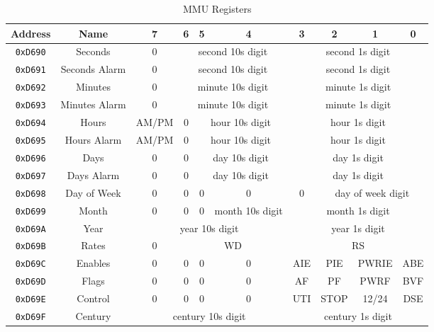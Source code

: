 \begin{table}[h]
	\begin{center}
		\begin{tabular}{| c | c || c | c | c | c | c | c | c | c |} \hline
			Address & Name & 7 & 6 & 5 & 4 & 3 & 2 & 1 & 0 \\ \hline\hline
			\verb+0xD690+ & Seconds & 0 & \multicolumn{3}{|c|}{second 10s digit} & \multicolumn{4}{|c|}{second 1s digit} \\ \hline
            \verb+0xD691+ & Seconds Alarm & 0 & \multicolumn{3}{|c|}{second 10s digit} & \multicolumn{4}{|c|}{second 1s digit} \\ \hline
            \verb+0xD692+ & Minutes & 0 & \multicolumn{3}{|c|}{minute 10s digit} & \multicolumn{4}{|c|}{minute 1s digit} \\ \hline
            \verb+0xD693+ & Minutes Alarm & 0 & \multicolumn{3}{|c|}{minute 10s digit} & \multicolumn{4}{|c|}{minute 1s digit} \\ \hline
            \verb+0xD694+ & Hours & AM/PM & 0 & \multicolumn{2}{|c|}{hour 10s digit} & \multicolumn{4}{|c|}{hour 1s digit} \\ \hline
            \verb+0xD695+ & Hours Alarm & AM/PM & 0 & \multicolumn{2}{|c|}{hour 10s digit} & \multicolumn{4}{|c|}{hour 1s digit} \\ \hline
            \verb+0xD696+ & Days & 0 & 0 & \multicolumn{2}{|c|}{day 10s digit} & \multicolumn{4}{|c|}{day 1s digit} \\ \hline
            \verb+0xD697+ & Days Alarm & 0 & 0 & \multicolumn{2}{|c|}{day 10s digit} & \multicolumn{4}{|c|}{day 1s digit} \\ \hline
            \verb+0xD698+ & Day of Week & 0 & 0 & 0 & 0 & 0 & \multicolumn{3}{|c|}{day of week digit} \\ \hline
            \verb+0xD699+ & Month & 0 & 0 & 0 & month 10s digit & \multicolumn{4}{|c|}{month 1s digit} \\ \hline
            \verb+0xD69A+ & Year & \multicolumn{4}{|c|}{year 10s digit} & \multicolumn{4}{|c|}{year 1s digit}  \\ \hline
            \verb+0xD69B+ & Rates & 0 & \multicolumn{3}{|c|}{WD} & \multicolumn{4}{|c|}{RS} \\ \hline
            \verb+0xD69C+ & Enables & 0 & 0 & 0 & 0 & AIE & PIE & PWRIE & ABE \\ \hline
            \verb+0xD69D+ & Flags & 0 & 0 & 0 & 0 & AF & PF & PWRF & BVF \\ \hline
            \verb+0xD69E+ & Control & 0 & 0 & 0 & 0 & UTI & STOP & 12/24 & DSE \\ \hline
            \verb+0xD69F+ & Century & \multicolumn{4}{|c|}{century 10s digit} & \multicolumn{4}{|c|}{century 1s digit}  \\ \hline
		\end{tabular}
	\end{center}
	\caption{MMU Registers}
	\label{tab:rtc_registers}
\end{table}

